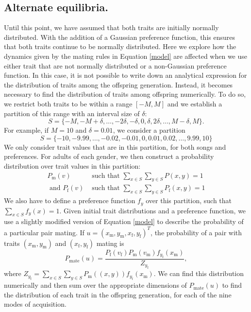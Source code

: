 \documentclass{article}
\newcommand{\x}[1]{\text{#1}}
\begin{document}
\subsection*{Alternate equilibria. }
Until this point, we have assumed that both traits are initially normally distributed. With the addition of a Gaussian preference function, this ensures that both traits continue to be normally distributed. Here we explore how the dynamics given by the mating rules in Equation \ref{model} are affected when we use either trait that are not normally distributed or a non-Gaussian preference function. In this case, it is not possible to write down an analytical expression for the distribution of traits among the offspring generation. Instead, it becomes necessary to find the distribution of traits among offspring numerically. To do so, we restrict both traits to be within a range $[-M,M]$ and we establish a partition of this range with an interval size of $\delta$:
$$
S=\{-M,-M+\delta,\dots,-2\delta,-\delta,0,\delta,2\delta,\dots,M-\delta,M\}.$$
For example, if $M=10$ and $\delta=0.01$, we consider a partition $$S=\{-10,-9.99,\dots,-0.02,-0.01,0,0.01,0.02,\dots,9.99,10\}$$
We only consider trait values that are in this partition, for both songs and preferences. For adults of each gender, we then construct a probability distribution over trait values in this partition:
\begin{align*}
P_\x{m}(v) &\text{ such that } \sum_{x\in S}\sum_{y \in S}P(x,y)=1
\\ \text{ and } P_\x{f}(v) &\text{ such that } \sum_{x\in S}\sum_{y \in S}P_\x{f}(x,y)=1
\end{align*}
We also have to define a preference function $f_y$ over this partition, such that $\sum_{x\in S}f_y(x)=1$. Given initial trait distributions and a preference function, we use a slightly modified version of Equation \ref{model} to describe the probability of a particular pair mating. If $u=(x_\x{m},y_\x{m},x_\x{f},y_\x{f})^T$, the probability of a pair with traits $(x_\x{m},y_\x{m})$ and $(x_\x{f},y_\x{f})$ mating is 
\begin{equation}
P_\text{mate}(u)=\frac{P_\x{f}(v_\x{f})P_\x{m}(v_\x{m})f_{y_\x{f}}(x_\x{m})}{Z_{y_\x{f}}}, \label{model_numerical}
\end{equation}
where $Z_{y_\x{f}}=\sum_{x\in S}\sum_{y\in S}P_\x{m}((x,y))f_{y_\x{f}}(x_\x{m})$. We can find this distribution numerically and then sum over the appropriate dimensions of $P_\text{mate}(u)$ to find the distribution of each trait in the offspring generation, for each of the nine modes of acquisition.
\end{document}
